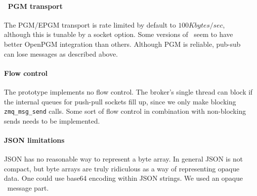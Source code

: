 \paragraph{\zMQ\ PGM transport}  The PGM/EPGM transport is rate limited by
default to $100 Kbytes/sec$, although this is tunable by a socket option.
Some versions of \zMQ\ seem to have better OpenPGM integration than others.
Although PGM is reliable, pub-sub can lose messages as described above.

\paragraph{Flow control}  The prototype implements no flow control.
The broker's single thread can block if the internal queues for push-pull
sockets fill up, since we only make blocking {\tt zmq\_msg\_send} calls.
Some sort of flow control in combination with non-blocking sends needs to
be implemented.

\paragraph{JSON limitations}  JSON has no reasonable way to represent
a byte array.  In general JSON is not compact, but byte arrays are truly
ridiculous as a way of representing opaque data.  One could use base64
encoding within JSON strings.  We used an opaque \zMQ\ message part.
